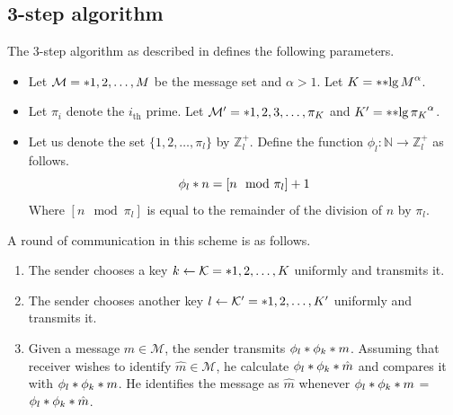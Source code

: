 \documentclass{article}
\begin{document}
\subsection{3-step algorithm}
The 3-step algorithm as described in \cite{multiway} defines the following parameters.
\begin{itemize}
	\item Let \(\mathcal{M} = \set{1,2, \dots, M }\) be the message set and \(\alpha > 1\). Let \(K = \ceil{\bracket{\lg M}^{\alpha}}\).
	\item Let \(\pi_i\) denote the \(i_{\mathrm{th}}\) prime. Let \(\mathcal{M}' = \set{1, 2, 3 ,\dots, \pi_K}\) and \(K' = \ceil{\bracket{\lg \pi_K}^{\alpha}}\). 
	\item Let us denote the set \(\{1,2, \dots, \pi_l \}\) by \(\mathbb{Z}^+_l\).  Define the function \(\phi_l: \mathbb{N} \to \mathbb{Z}_{l}^+ \) as follows.
	\begin{equation}
		\func{\phi_l}{n} = [n \mod \pi_l] + 1
	\end{equation}
	Where \([n \mod \pi_l]\) is equal to the remainder of the division of \(n\) by \(\pi_l\).
\end{itemize}
A round of communication in this scheme is as follows.
\begin{enumerate}
	\item The sender chooses a key \(k \gets \mathcal{K} = \set{1,2,\dots, K }\) uniformly and transmits it.
	\item The sender chooses another key \(l \gets \mathcal{K}' = \set{1,2,\dots, K' }\) uniformly and transmits it.
	\item Given a message \(m \in \mathcal{M}\), the sender transmits \(\func{\phi_l}{\func{\phi_k}{m}}\). Assuming that receiver wishes to identify \(\hat{m} \in \mathcal{M}\), he calculate \(\func{\phi_l}{\func{\phi_k}{\hat{m}}}\) and compares it with \(\func{\phi_l}{\func{\phi_k}{m}}\). He identifies the message as \(\hat{m}\) whenever \(\func{\phi_l}{\func{\phi_k}{m}}\) = \(\func{\phi_l}{\func{\phi_k}{\hat{m}}}\).
\end{enumerate}
\end{document}
